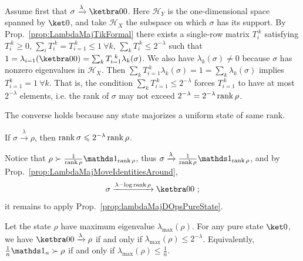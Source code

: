 \documentclass[12pt,a4paper]{article}
\def\Hs{\mathscr{H}}%
\newenvironment{myproof}[1][\proofname]{%
  \color{prooftextcolor} \footnotesize \proof[\itshape #1]\hspace*{1.2mm}%
}{\endproof}
\newcommand{\lambdamaj}[1]{\xrightarrow{#1}}
\begin{document}
\begin{myproof}[Proof of Prop.~\ref{prop:lambdaMajDOpsPureState}]
  Assume first that  $\sigma\lambdamaj\lambda\ketbra00$. Here $\Hs_Y$ is the one-dimensional space
  spanned by $\ket0$, and take $\Hs_X$ the subspace on which $\sigma$ has its support. By
  Prop.~\ref{prop:LambdaMajTikFormal} there exists a single-row matrix
  $T_i^{~k}$ satisfying $T_i^{~k}\geqslant 0$, $\sum_i T_i^{~k} = T_{i=1}^{~k} \leqslant 1~\forall k$,
  $\sum_k T_i^{~k} \leqslant 2^{-\lambda}$ such that
  $1 = \lambda_{i=1}(\ketbra00) = \sum_k T_{i=1}^{~k} \lambda_k(\sigma)$. We also have $\lambda_k(\sigma)\neq 0$
  because $\sigma$ has nonzero eigenvalues in $\Hs_X$. Then
  $\sum_k T_{i=1}^{~k} \lambda_k(\sigma) = 1 = \sum_k\lambda_k(\sigma)$ implies $T_{i=1}^k = 1~\forall k$.
  That is, the condition $\sum_k T_{i=1}^{~k} \leqslant 2^{-\lambda}$ forces $T_{i=1}^{~k}$ to have at most
  $2^{-\lambda}$ elements, i.e. the rank of $\sigma$ may not exceed $2^{-\lambda}=2^{-\lambda} \operatorname{rank}\rho$.

  The converse holds because any state majorizes a uniform state of same rank.
\end{myproof}

\begin{prop}
  \label{prop:lambdaMajDOpsConditionRanks}
  If $\sigma\lambdamaj\lambda\rho$, then $\operatorname{rank}\sigma\leqslant 2^{-\lambda}\operatorname{rank}\rho$. 
\end{prop}

\begin{myproof}[Proof of Prop.~\ref{prop:lambdaMajDOpsConditionRanks}]
  Notice that $\rho\succ\frac1{\rank\rho}\Ident_{\rank\rho}$, thus
  $\sigma\lambdamaj\lambda\frac1{\rank\rho}\Ident_{\rank\rho}$, and by
  Prop.~\ref{prop:LambdaMajMoveIdentitiesAround},
  \begin{equation*}
    \sigma\lambdamaj{\lambda-\log\rank\rho} \ketbra00\ ;
  \end{equation*}
  it remains to apply Prop.~\ref{prop:lambdaMajDOpsPureState}.
\end{myproof}


\begin{prop}
  \label{prop:LambdaMajorizedDOpsByPureState}
  Let the state $\rho$ have maximum eigenvalue $\lambda_\mathrm{max}(\rho)$.
  For any pure state $\ket0$, we have $\ketbra00 \lambdamaj\lambda \rho$ if and only if
  $\lambda_\mathrm{max}(\rho) \leqslant 2^{-\lambda}$. Equivalently, $\frac1n\Ident_n\succ\rho$ if and
  only if $\lambda_\mathrm{max}(\rho) \leqslant \frac1n$.
\end{prop}
\end{document}
